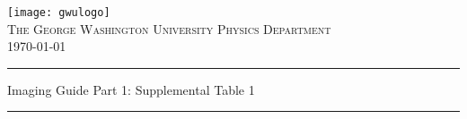 \documentclass{article}
\begin{document}
\noindent

\begin{center}

\texttt{[image: gwulogo]}~\\[1cm]

\textsc{\LARGE The George Washington University\vspace{.2cm}
Physics Department}\\[.4cm]

{\large \today}
\vspace{.5cm}

\hrule \vspace{.4cm}
{ \huge \bfseries  

Imaging Guide Part 1: Supplemental Table 1

\vspace{0.2cm} }
\hrule \vspace{1.5cm}

\end{center}






\newpage
{}

{\footnotesize}  %
\end{document}
